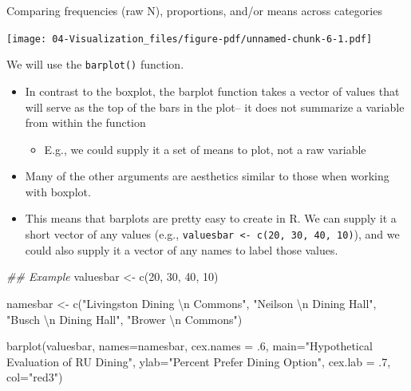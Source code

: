 \documentclass[
  letterpaper,
  DIV=11,
  numbers=noendperiod]{scrreprt}
\newenvironment{Shaded}{\begin{snugshade}}{\end{snugshade}}
\newcommand{\AttributeTok}[1]{\textcolor[rgb]{0.40,0.45,0.13}{#1}}
\newcommand{\DecValTok}[1]{\textcolor[rgb]{0.68,0.00,0.00}{#1}}
\newcommand{\DocumentationTok}[1]{\textcolor[rgb]{0.37,0.37,0.37}{\textit{#1}}}
\newcommand{\FunctionTok}[1]{\textcolor[rgb]{0.28,0.35,0.67}{#1}}
\newcommand{\NormalTok}[1]{\textcolor[rgb]{0.00,0.23,0.31}{#1}}
\newcommand{\OtherTok}[1]{\textcolor[rgb]{0.00,0.23,0.31}{#1}}
\newcommand{\SpecialCharTok}[1]{\textcolor[rgb]{0.37,0.37,0.37}{#1}}
\newcommand{\StringTok}[1]{\textcolor[rgb]{0.13,0.47,0.30}{#1}}
\providecommand{\tightlist}{%
  \setlength{\itemsep}{0pt}\setlength{\parskip}{0pt}}\usepackage{longtable,booktabs,array}
\begin{document}
Comparing frequencies (raw N), proportions, and/or means across
categories

\texttt{[image: 04-Visualization\_files/figure-pdf/unnamed-chunk-6-1.pdf]}

We will use the \texttt{barplot()} function.

\begin{itemize}
\tightlist
\item
  In contrast to the boxplot, the barplot function takes a vector of
  values that will serve as the top of the bars in the plot-- it does
  not summarize a variable from within the function

  \begin{itemize}
  \tightlist
  \item
    E.g., we could supply it a set of means to plot, not a raw variable
  \end{itemize}
\item
  Many of the other arguments are aesthetics similar to those when
  working with boxplot.
\item
  This means that barplots are pretty easy to create in R. We can supply
  it a short vector of any values (e.g.,
  \texttt{valuesbar\ \textless{}-\ c(20,\ 30,\ 40,\ 10)}), and we could
  also supply it a vector of any names to label those values.
\end{itemize}

\begin{Shaded}
\begin{Highlighting}[]
\DocumentationTok{\#\# Example}
\NormalTok{valuesbar }\OtherTok{\textless{}{-}} \FunctionTok{c}\NormalTok{(}\DecValTok{20}\NormalTok{, }\DecValTok{30}\NormalTok{, }\DecValTok{40}\NormalTok{, }\DecValTok{10}\NormalTok{)}

\NormalTok{namesbar }\OtherTok{\textless{}{-}} \FunctionTok{c}\NormalTok{(}\StringTok{"Livingston Dining }\SpecialCharTok{\textbackslash{}n}\StringTok{ Commons"}\NormalTok{,}
              \StringTok{"Neilson }\SpecialCharTok{\textbackslash{}n}\StringTok{ Dining Hall"}\NormalTok{,}
              \StringTok{"Busch }\SpecialCharTok{\textbackslash{}n}\StringTok{ Dining Hall"}\NormalTok{,}
              \StringTok{"Brower }\SpecialCharTok{\textbackslash{}n}\StringTok{ Commons"}\NormalTok{)}

\FunctionTok{barplot}\NormalTok{(valuesbar,}
        \AttributeTok{names=}\NormalTok{namesbar,}
        \AttributeTok{cex.names =}\NormalTok{ .}\DecValTok{6}\NormalTok{,}
        \AttributeTok{main=}\StringTok{"Hypothetical Evaluation of RU Dining"}\NormalTok{,}
        \AttributeTok{ylab=}\StringTok{"Percent Prefer Dining Option"}\NormalTok{,}
        \AttributeTok{cex.lab =}\NormalTok{ .}\DecValTok{7}\NormalTok{, }
        \AttributeTok{col=}\StringTok{"red3"}\NormalTok{)}
\end{Highlighting}
\end{Shaded}
\end{document}
